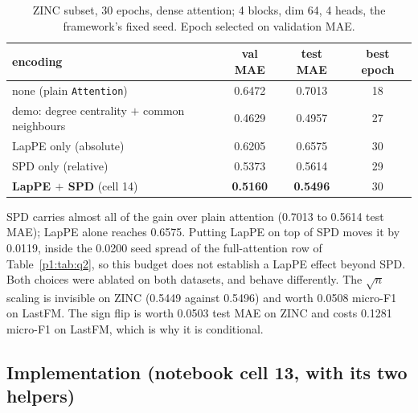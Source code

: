 \begin{table}[H]
\centering
\caption{ZINC subset, 30 epochs, dense attention; 4 blocks, dim 64, 4 heads, the framework's fixed seed. Epoch selected on validation MAE.}
\label{p1:tab:q1}
\begin{tabular}{lccc}
\toprule
encoding & val MAE & test MAE & best epoch \\
\midrule
none (plain \texttt{Attention}) & 0.6472 & 0.7013 & 18 \\
demo: degree centrality $+$ common neighbours & 0.4629 & 0.4957 & 27 \\
LapPE only (absolute) & 0.6205 & 0.6575 & 30 \\
SPD only (relative) & 0.5373 & 0.5614 & 29 \\
\textbf{LapPE $+$ SPD} (cell 14) & \textbf{0.5160} & \textbf{0.5496} & 30 \\
\bottomrule
\end{tabular}
\end{table}

SPD carries almost all of the gain over plain attention (0.7013 to 0.5614 test MAE); LapPE alone reaches 0.6575. Putting LapPE on top of SPD moves it by 0.0119, inside the 0.0200 seed spread of the full-attention row of Table~\ref{p1:tab:q2}, so this budget does not establish a LapPE effect beyond SPD. Both choices were ablated on both datasets, and behave differently. The $\sqrt{n}$ scaling is invisible on ZINC (0.5449 against 0.5496) and worth 0.0508 micro-F1 on LastFM. The sign flip is worth 0.0503 test MAE on ZINC and costs 0.1281 micro-F1 on LastFM, which is why it is conditional.

\subsection*{Implementation (notebook cell 13, with its two helpers)}

